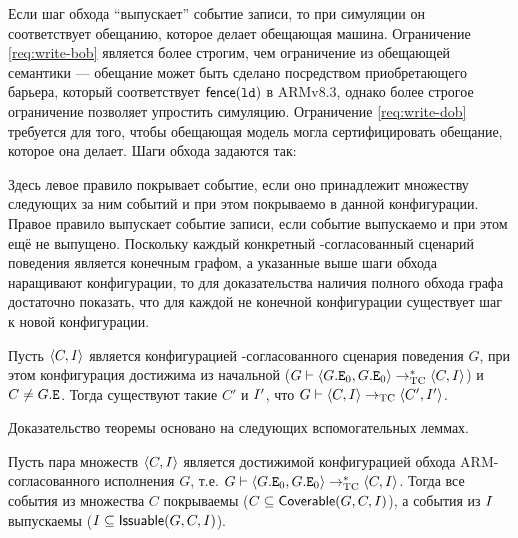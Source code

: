 Если шаг обхода  ``выпускает'' событие записи, то при симуляции он соответствует обещанию, которое делает обещающая машина.
Ограничение \ref{req:write-bob} является более строгим, чем ограничение из обещающей семантики ---
обещание может быть сделано  посредством приобретающего барьера, который соответствует $\mathsf{fence}({\mathtt{ld}})$ в ARMv8.3,
однако более строгое ограничение позволяет упростить симуляцию.
Ограничение \ref{req:write-dob} требуется для того, чтобы обещающая модель могла сертифицировать обещание, которое она
делает.
Шаги обхода задаются так:
Здесь левое правило покрывает событие, если оно принадлежит множеству
следующих за ним событий и при этом покрываемо в данной конфигурации.
Правое правило выпускает событие записи, если событие выпускаемо и при этом ещё не выпущено.
Поскольку каждый конкретный \ARM-согласованный сценарий поведения
является конечным графом,
а указанные выше шаги обхода наращивают конфигурации, то для доказательства наличия полного
обхода графа достаточно показать, что для каждой не конечной конфигурации существует шаг к новой конфигурации.
\begin{theorem}
  \label{prop:trav-step}
  Пусть ${\langle{C, I}\rangle}$ является конфигурацией \ARM-согласованного сценария поведения $G$,
  при этом конфигурация достижима из начальной
  ($G \vdash {\langle{G.{\mathtt{E}}_0, G.{\mathtt{E}}_0}\rangle} \rightarrow_{\rm TC}^{*} {\langle{C, I}\rangle}$) и $C \neq G.{\mathtt{E}}$.
  Тогда существуют такие $C'$ и $I'$, что
  $G \vdash {\langle{C, I}\rangle} \rightarrow_{\rm TC} {\langle{C', I'}\rangle}$.
\end{theorem}
Доказательство теоремы основано на следующих вспомогательных леммах.%
\begin{lemma}
  \label{prop:trav-prop-preserve}
  Пусть пара множеств ${\langle{C, I}\rangle}$ является достижимой конфигурацией обхода
  ARM-согласованного исполнения $G$, т.е.
  $G \vdash {\langle{G.{\mathtt{E}}_0, G.{\mathtt{E}}_0}\rangle} \rightarrow_{\rm TC}^{*} {\langle{C, I}\rangle}$.
  Тогда все события из множества $C$ покрываемы ($C \subseteq {\sf Coverable}(G,C,I)$),
  а события из $I$ выпускаемы ($I \subseteq {\sf Issuable}(G,C,I)$).
\end{lemma}
